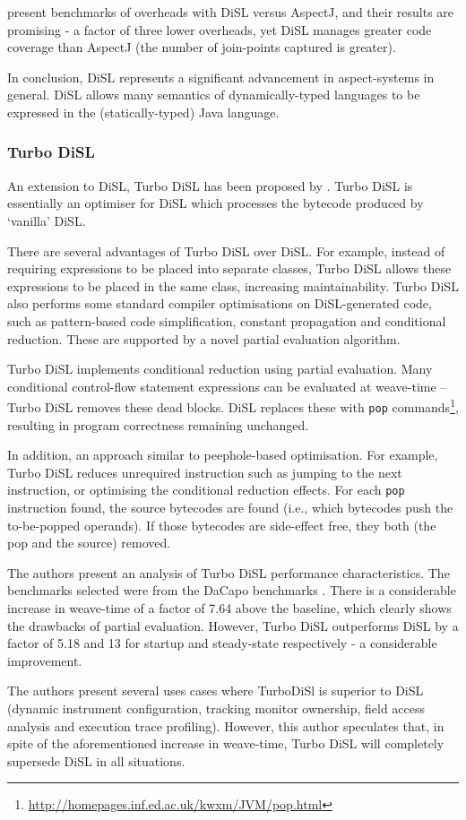                 \citeauthor{Marek2012} present benchmarks of overheads with DiSL versus AspectJ, and their results are promising - a factor of three lower overheads, yet DiSL manages greater code coverage than AspectJ (the number of join-points captured is greater).

                In conclusion, DiSL represents a significant advancement in aspect-systems in general. DiSL allows many semantics of dynamically-typed languages to be expressed in the (statically-typed) Java language.

                \subsubsection{Turbo DiSL} \label{sec:instrumentation/hybrid/disl/turbo}
                An extension to DiSL, Turbo DiSL has been proposed by \citet[p.~353-368]{Furia2012}. Turbo DiSL is essentially an optimiser for DiSL which processes the bytecode produced by `vanilla' DiSL.

                There are several advantages of Turbo DiSL over DiSL. For example, instead of requiring expressions to be placed into separate classes, Turbo DiSL allows these expressions to be placed in the same class, increasing maintainability. Turbo DiSL also performs some standard compiler optimisations on DiSL-generated code, such as pattern-based code simplification, constant propagation and conditional reduction. These are supported by a novel partial evaluation algorithm.

                Turbo DiSL implements conditional reduction using partial evaluation. Many conditional control-flow statement expressions can be evaluated at weave-time -- Turbo DiSL removes these dead blocks. DiSL replaces these with \texttt{pop} commands\footnote{\url{http://homepages.inf.ed.ac.uk/kwxm/JVM/pop.html}}, resulting in program correctness remaining unchanged.

                In addition, an approach similar to peephole-based optimisation. For example, Turbo DiSL reduces unrequired instruction such as jumping to the next instruction, or optimising the conditional reduction effects. For each \texttt{pop} instruction found, the source bytecodes are found (i.e., which bytecodes push the to-be-popped operands). If those bytecodes are side-effect free, they both (the pop and the source) removed.

                The authors present an analysis of Turbo DiSL performance characteristics. The benchmarks selected were from the DaCapo benchmarks \citep{Blackburn2006}. There is a considerable increase in weave-time of a factor of 7.64 above the baseline, which clearly shows the drawbacks of partial evaluation. However, Turbo DiSL outperforms DiSL by a factor of 5.18 and 13 for startup and steady-state respectively - a considerable improvement.

                The authors present several uses cases where TurboDiSl is superior to DiSL (dynamic instrument configuration, tracking monitor ownership, field access analysis and execution trace profiling). However, this author speculates that, in spite of the aforementioned increase in weave-time, Turbo DiSL will completely supersede DiSL in all situations.